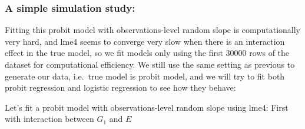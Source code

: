 \documentclass[]{article}
\newenvironment{Shaded}{\begin{snugshade}}{\end{snugshade}}
\newcommand{\DataTypeTok}[1]{\textcolor[rgb]{0.13,0.29,0.53}{#1}}
\newcommand{\DecValTok}[1]{\textcolor[rgb]{0.00,0.00,0.81}{#1}}
\newcommand{\KeywordTok}[1]{\textcolor[rgb]{0.13,0.29,0.53}{\textbf{#1}}}
\newcommand{\NormalTok}[1]{#1}
\newcommand{\OperatorTok}[1]{\textcolor[rgb]{0.81,0.36,0.00}{\textbf{#1}}}
\newcommand{\StringTok}[1]{\textcolor[rgb]{0.31,0.60,0.02}{#1}}
\begin{document}
\hypertarget{a-simple-simulation-study-1}{%
\subsubsection{A simple simulation
study:}\label{a-simple-simulation-study-1}}

Fitting this probit model with observations-level random slope is
computationally very hard, and lme4 seems to converge very slow when
there is an interaction effect in the true model, so we fit models only
using the first 30000 rows of the dataset for computational efficiency.
We still use the same setting as previous to generate our data,
i.e.~true model is probit model, and we will try to fit both probit
regression and logistic regression to see how they behave:

Let's fit a probit model with observations-level random slope using
lme4: First with interaction between \(G_1\) and \(E\)

\begin{Shaded}
\end{Shaded}
\end{document}
